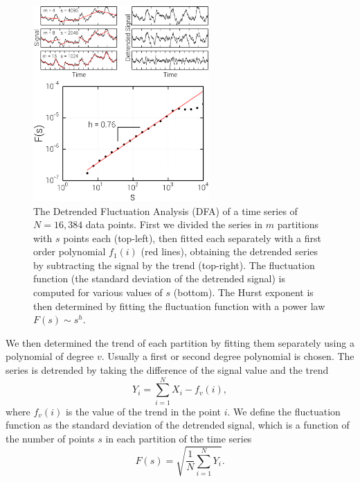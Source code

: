 \begin{figure}
    \begin{center}
        \includegraphics[width=0.6\textwidth]{chapters/ch6-asle/figs/dfa}
    \end{center}
    \caption{The Detrended Fluctuation Analysis (DFA) of a time series of
        $N=16,384$ data points. First we divided the series in $m$ partitions with
        $s$ points each (top-left), then fitted each separately with a first order
        polynomial $f_1(i)$ (red lines), obtaining the detrended series by subtracting
        the signal by the trend (top-right).  The fluctuation function (the standard
        deviation of the detrended signal) is computed for various values of $s$
        (bottom).  The Hurst exponent is then determined by fitting the fluctuation
        function with a power law $F(s)\sim s^h$.}
\label{fig:dfa}
\end{figure}

We then determined the trend of each partition by fitting them separately using
a polynomial of degree $v$. Usually a first or second degree polynomial is
chosen. The series is detrended by taking the difference of the signal value and
the trend 
\begin{equation}
    Y_i = \sum_{i=1}^{N} X_i - f_v(i),
\end{equation}
where $f_v(i)$ is the value of the trend in the point $i$. We define the fluctuation
function as the standard deviation of the detrended signal, which is a function
of the number of points $s$ in each partition of the time series
\begin{equation}
    F(s) = \sqrt{\frac{1}{N}\sum_{i=1}^{N}Y_i}.
\end{equation}

